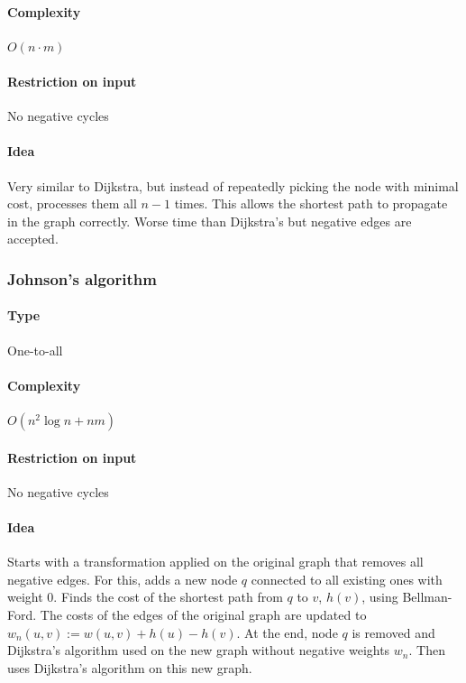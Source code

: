 \documentclass[a4paper]{article}
\begin{document}
\paragraph{Complexity} $O\left(n\cdot m\right)$

\paragraph{Restriction on input} No negative cycles

\paragraph{Idea} Very similar to Dijkstra, but instead of repeatedly picking the node with minimal cost, processes them all $n-1$ times. This allows the shortest path to propagate in the graph correctly. Worse time than Dijkstra's but negative edges are accepted.

\subsubsection{Johnson's algorithm}

\paragraph{Type} One-to-all

\paragraph{Complexity} $O\left(n^2\log n + nm\right)$

\paragraph{Restriction on input} No negative cycles

\paragraph{Idea} Starts with a transformation applied on the original graph that removes all negative edges. For this, adds a new node $q$ connected to all existing ones with weight $0$. Finds the cost of the shortest path from $q$ to $v$, $h(v)$, using Bellman-Ford. The costs of the edges of the original graph are updated to $w_n(u,v):=w(u,v)+h(u)-h(v)$. At the end, node $q$ is removed and Dijkstra's algorithm used on the new graph without negative weights $w_n$. Then uses Dijkstra's algorithm on this new graph.
\end{document}
